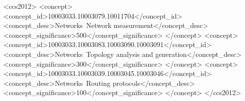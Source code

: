 \documentclass[sigconf,anonymous,10pt]{acmart}
\begin{document}
\begin{abstract}
\end{abstract}



\begin{CCSXML}
<ccs2012>
<concept>
<concept_id>10003033.10003079.10011704</concept_id>
<concept_desc>Networks~Network measurement</concept_desc>
<concept_significance>500</concept_significance>
</concept>
<concept>
<concept_id>10003033.10003083.10003090.10003091</concept_id>
<concept_desc>Networks~Topology analysis and generation</concept_desc>
<concept_significance>300</concept_significance>
</concept>
<concept>
<concept_id>10003033.10003039.10003045.10003046</concept_id>
<concept_desc>Networks~Routing protocols</concept_desc>
<concept_significance>100</concept_significance>
</concept>
</ccs2012>
\end{CCSXML}
\end{document}
